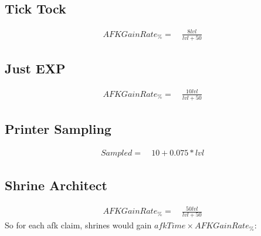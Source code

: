         \subsection{Tick Tock}
        \begin{align*}
            AFKGainRate_\% = &\ \frac{8lvl}{lvl + 50}
        \end{align*}

        \subsection{Just EXP}
        \begin{align*}
            AFKGainRate_\% = &\ \frac{10lvl}{lvl + 50}
        \end{align*}
        \subsection{Printer Sampling}
        \begin{align*}
            Sampled = &\ 10 + 0.075 * lvl
        \end{align*}

        \subsection{Shrine Architect}
        \begin{align*}
            AFKGainRate_\% = &\ \frac{50lvl}{lvl + 50}
        \end{align*}
        So for each afk claim, shrines would gain $afkTime \times AFKGainRate_\%$: 
